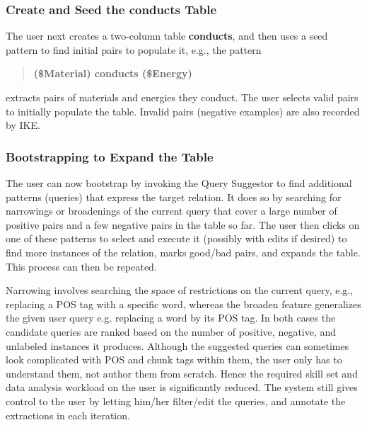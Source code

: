 \documentclass[11pt,letterpaper]{article}
\newcommand{\pred}{\bf}
\begin{document}
\subsubsection{Create and Seed the {\pred conducts} Table}

The user next creates a two-column table {\pred conducts}, and then uses a seed pattern to find initial pairs to populate it, e.g., the pattern
\begin{quote}
{\bf (\$Material) conducts (\$Energy)}
\end{quote}
extracts pairs of materials and energies they conduct. The user selects valid pairs to initially populate the table. Invalid pairs (negative examples) are also recorded by IKE.

\subsubsection{Bootstrapping to Expand the Table}


The user can now bootstrap by invoking the Query Suggestor to find additional patterns (queries) that express the target relation.
It does so by searching for narrowings or broadenings of the current query that cover a large number of positive pairs and a few negative pairs in the table so far. The user then clicks on one of these patterns to select and execute it (possibly with edits if desired) to find more instances of the relation, marks good/bad pairs, and expands the table. This process can then be repeated.

Narrowing involves searching the space of restrictions on the current query, e.g., replacing a POS tag with a specific word, whereas the broaden feature generalizes the given user query e.g. replacing a word by its POS tag. In both cases the candidate queries are ranked based on the number of positive, negative, and unlabeled instances it produces. 
Although the suggested queries can sometimes look complicated with POS and chunk tags within them, the user only has to understand them, not author them from scratch. Hence the required skill set and data analysis workload on the user is significantly reduced. The system still gives control to the user by letting him/her filter/edit the queries, and annotate the extractions in each iteration. 
\end{document}
